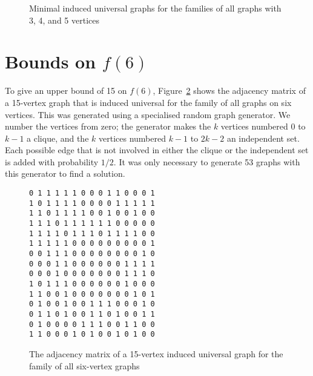 \documentclass[12pt]{article}
\begin{document}
\begin{figure}[h]
\label{fig:graphs}
\caption{Minimal induced universal graphs for the families of all
graphs with 3, 4, and 5 vertices}
\end{figure}

\section{Bounds on $f(6)$}

To give an upper bound of 15 on $f(6)$, Figure~\ref{fig:adjmat15} shows the
adjacency matrix of a 15-vertex graph that is induced universal for the family
of all graphs on six vertices.  This was generated using a specialised random
graph generator.  We number the vertices from zero; the generator makes the
$k$ vertices numbered $0$ to $k-1$ a clique, and the $k$ vertices numbered $k-1$ to $2k-2$ an
independent set.  Each possible edge that is not involved in either the clique
or the independent set is added with probability $1/2$.  It was only necessary
to generate 53 graphs with this generator to find a solution.

\begin{figure}[h]
\centering
\verb|0 1 1 1 1 1 0 0 0 1 1 0 0 0 1| \\
\verb|1 0 1 1 1 1 0 0 0 0 1 1 1 1 1| \\
\verb|1 1 0 1 1 1 1 0 0 1 0 0 1 0 0| \\
\verb|1 1 1 0 1 1 1 1 1 1 0 0 0 0 0| \\
\verb|1 1 1 1 0 1 1 1 0 1 1 1 1 0 0| \\
\verb|1 1 1 1 1 0 0 0 0 0 0 0 0 0 1| \\
\verb|0 0 1 1 1 0 0 0 0 0 0 0 0 1 0| \\
\verb|0 0 0 1 1 0 0 0 0 0 0 1 1 1 1| \\
\verb|0 0 0 1 0 0 0 0 0 0 0 1 1 1 0| \\
\verb|1 0 1 1 1 0 0 0 0 0 0 1 0 0 0| \\
\verb|1 1 0 0 1 0 0 0 0 0 0 0 1 0 1| \\
\verb|0 1 0 0 1 0 0 1 1 1 0 0 0 1 0| \\
\verb|0 1 1 0 1 0 0 1 1 0 1 0 0 1 1| \\
\verb|0 1 0 0 0 0 1 1 1 0 0 1 1 0 0| \\
\verb|1 1 0 0 0 1 0 1 0 0 1 0 1 0 0|
\caption{The adjacency matrix of a 15-vertex induced universal graph for the family of all
six-vertex graphs}
\label{fig:adjmat15}
\end{figure}
\end{document}
